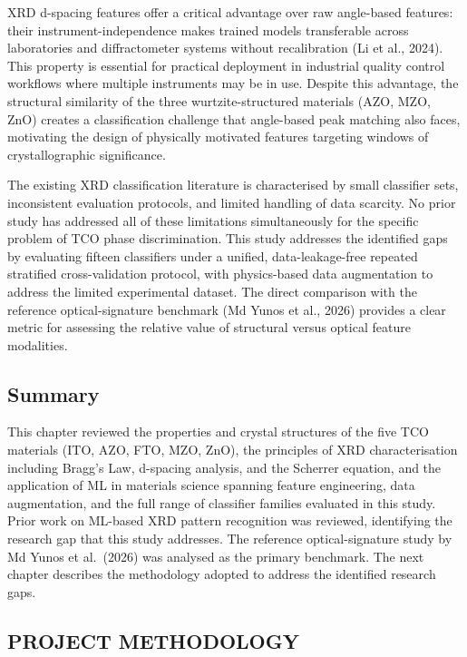 \documentclass[12pt, oneside]{article} %
\begin{document}
XRD d-spacing features offer a critical advantage over raw angle-based features: their instrument-independence makes trained models transferable across laboratories and diffractometer systems without recalibration (Li et al., 2024). This property is essential for practical deployment in industrial quality control workflows where multiple instruments may be in use. Despite this advantage, the structural similarity of the three wurtzite-structured materials (AZO, MZO, ZnO) creates a classification challenge that angle-based peak matching also faces, motivating the design of physically motivated features targeting windows of crystallographic significance.

The existing XRD classification literature is characterised by small classifier sets, inconsistent evaluation protocols, and limited handling of data scarcity. No prior study has addressed all of these limitations simultaneously for the specific problem of TCO phase discrimination. This study addresses the identified gaps by evaluating fifteen classifiers under a unified, data-leakage-free repeated stratified cross-validation protocol, with physics-based data augmentation to address the limited experimental dataset. The direct comparison with the reference optical-signature benchmark (Md Yunos et al., 2026) provides a clear metric for assessing the relative value of structural versus optical feature modalities.


\subsection{Summary}

This chapter reviewed the properties and crystal structures of the five TCO materials (ITO, AZO, FTO, MZO, ZnO), the principles of XRD characterisation including Bragg's Law, d-spacing analysis, and the Scherrer equation, and the application of ML in materials science spanning feature engineering, data augmentation, and the full range of classifier families evaluated in this study. Prior work on ML-based XRD pattern recognition was reviewed, identifying the research gap that this study addresses. The reference optical-signature study by Md Yunos et al.\ (2026) was analysed as the primary benchmark. The next chapter describes the methodology adopted to address the identified research gaps.



\vfill \null

\newpage

\vfill \null
\thispagestyle{empty}
\begin{center}
\section{PROJECT METHODOLOGY}
\end{center}
\vspace{2cm}
\end{document}
